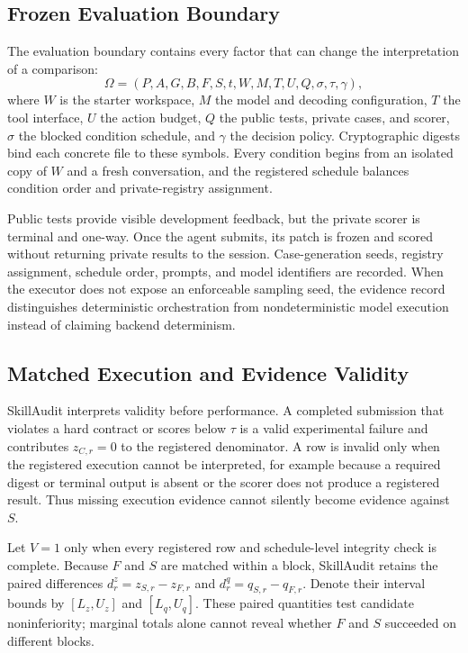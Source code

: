 \subsection{Frozen Evaluation Boundary}

The evaluation boundary contains every factor that can change the interpretation of a comparison:
\begin{equation}
\Omega=(P,A,G,B,F,S,t,W,M,T,U,Q,\sigma,\tau,\gamma),
\label{eq:boundary}
\end{equation}
where $W$ is the starter workspace, $M$ the model and decoding configuration, $T$ the tool interface, $U$ the action budget, $Q$ the public tests, private cases, and scorer, $\sigma$ the blocked condition schedule, and $\gamma$ the decision policy. Cryptographic digests bind each concrete file to these symbols. Every condition begins from an isolated copy of $W$ and a fresh conversation, and the registered schedule balances condition order and private-registry assignment.

Public tests provide visible development feedback, but the private scorer is terminal and one-way. Once the agent submits, its patch is frozen and scored without returning private results to the session. Case-generation seeds, registry assignment, schedule order, prompts, and model identifiers are recorded. When the executor does not expose an enforceable sampling seed, the evidence record distinguishes deterministic orchestration from nondeterministic model execution instead of claiming backend determinism.

\subsection{Matched Execution and Evidence Validity}

SkillAudit interprets validity before performance. A completed submission that violates a hard contract or scores below $\tau$ is a valid experimental failure and contributes $z_{C,r}=0$ to the registered denominator. A row is invalid only when the registered execution cannot be interpreted, for example because a required digest or terminal output is absent or the scorer does not produce a registered result. Thus missing execution evidence cannot silently become evidence against $S$.

Let $V=1$ only when every registered row and schedule-level integrity check is complete. Because $F$ and $S$ are matched within a block, SkillAudit retains the paired differences $d^z_r=z_{S,r}-z_{F,r}$ and $d^q_r=q_{S,r}-q_{F,r}$. Denote their interval bounds by $[L_z,U_z]$ and $[L_q,U_q]$. These paired quantities test candidate noninferiority; marginal totals alone cannot reveal whether $F$ and $S$ succeeded on different blocks.

